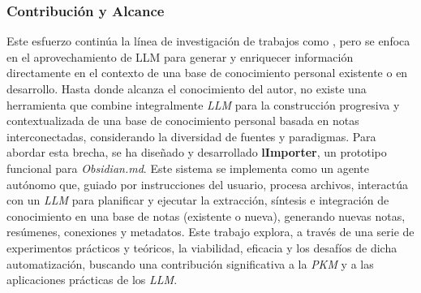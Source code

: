 \subsubsection{Contribución y Alcance}
\label{sec:contribucion_alcance}
Este esfuerzo continúa la línea de investigación de trabajos como \cite{fragaAutomaticGenerationKnowledge2023}, pero se enfoca en el aprovechamiento de LLM para generar y enriquecer información directamente en el contexto de una base de conocimiento personal existente o en desarrollo. Hasta donde alcanza el conocimiento del autor, no existe una herramienta que combine integralmente \textit{LLM} para la construcción progresiva y contextualizada de una base de conocimiento personal basada en notas interconectadas, considerando la diversidad de fuentes y paradigmas. Para abordar esta brecha, se ha diseñado y desarrollado \textbf{lImporter}, un prototipo funcional para \textit{Obsidian.md}. Este sistema se implementa como un agente autónomo que, guiado por instrucciones del usuario, procesa archivos, interactúa con un \textit{LLM} para planificar y ejecutar la extracción, síntesis e integración de conocimiento en una base de notas (existente o nueva), generando nuevas notas, resúmenes, conexiones y metadatos. Este trabajo explora, a través de una serie de experimentos prácticos y teóricos, la viabilidad, eficacia y los desafíos de dicha automatización, buscando una contribución significativa a la \textit{PKM} y a las aplicaciones prácticas de los \textit{LLM}.